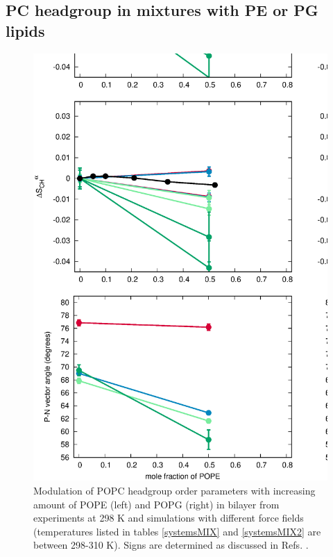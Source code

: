 \documentclass[journal=jpcbfk]{achemso}
\begin{document}
\subsection{PC headgroup in mixtures with PE or PG lipids}
\begin{figure}[]
  \centering
  \includegraphics[width=16.0cm]{./Figs/HGorderparametersPCvsPEPG.eps}
  \caption{\label{HGorderparametersPCvsPEPG}
    Modulation of POPC headgroup order parameters with increasing amount of POPE (left) and POPG (right) in bilayer
    from experiments at 298 K \cite{scherer87,macdonald87} and simulations with different force fields
    (temperatures listed in tables \ref{systemsMIX} and \ref{systemsMIX2} are between 298-310 K).
    Signs are determined as discussed in Refs. .
  }
\end{figure}
\end{document}
